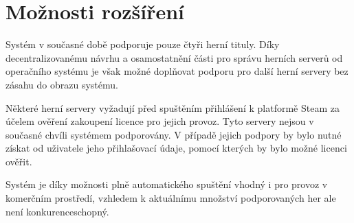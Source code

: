 \section{Možnosti rozšíření}

Systém v současné době podporuje pouze čtyři herní tituly. Díky decentralizovanému návrhu
a osamostatnění části pro správu herních serverů od operačního systému je však možné doplňovat podporu
pro další herní servery bez zásahu do obrazu systému.

Některé herní servery vyžadují před spuštěním přihlášení k platformě Steam za účelem ověření zakoupení licence
pro jejich provoz. Tyto servery nejsou v současné chvíli systémem podporovány. V případě jejich podpory
by bylo nutné získat od uživatele jeho přihlašovací údaje, pomocí kterých by bylo možné licenci ověřit.

Systém je díky možnosti plně automatického spuštění vhodný i pro provoz v komerčním prostředí, vzhledem k aktuálnímu
množství podporovaných her ale není konkurenceschopný.

